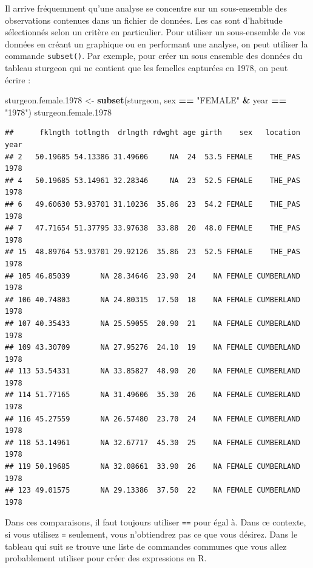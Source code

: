 \documentclass[12pt,]{book}
\makeatletter
\newenvironment{Shaded}{\begin{snugshade}}{\end{snugshade}}
\newcommand{\FloatTok}[1]{\textcolor[rgb]{0.06,0.06,0.06}{#1}}
\newcommand{\KeywordTok}[1]{\textcolor[rgb]{0.27,0.27,0.27}{\textbf{#1}}}
\newcommand{\NormalTok}[1]{#1}
\newcommand{\OperatorTok}[1]{\textcolor[rgb]{0.43,0.43,0.43}{\textbf{#1}}}
\newcommand{\StringTok}[1]{\textcolor[rgb]{0.5,0.5,0.5}{#1}}
\newenvironment{kframe}{%
\medskip{}
\setlength{\fboxsep}{.8em}
 \def\at@end@of@kframe{}%
 \ifinner\ifhmode%
  \def\at@end@of@kframe{\end{minipage}}%
  \begin{minipage}{\columnwidth}%
 \fi\fi%
 \def\FrameCommand##1{\hskip\@totalleftmargin \hskip-\fboxsep
 \colorbox{shadecolor}{##1}\hskip-\fboxsep
     \hskip-\linewidth \hskip-\@totalleftmargin \hskip\columnwidth}%
 \MakeFramed {\advance\hsize-\width
   \@totalleftmargin\z@ \linewidth\hsize
   \@setminipage}}%
 {\par\unskip\endMakeFramed%
 \at@end@of@kframe}
\newenvironment{rmdblock}[1]
  {
  \begin{itemize}
  \renewcommand{\labelitemi}{
    \raisebox{-.7\height}[0pt][0pt]{
      {\setkeys{Gin}{width=3em,keepaspectratio}\texttt{[image: images/\#1]}}
    }
  }
  \setlength{\fboxsep}{1em}
  \begin{kframe}
  \item
  }
  {
  \end{kframe}
  \end{itemize}
  }
\newenvironment{rmdcaution}
  {\begin{rmdblock}{caution}}
  {\end{rmdblock}}
\makeatother
\begin{document}
Il arrive fréquemment qu'une analyse se concentre sur un sous-ensemble des observations contenues dans un fichier de données.
Les cas sont d'habitude sélectionnés selon un critère en particulier.
Pour utiliser un sous-ensemble de vos données en créant un graphique ou en performant une analyse, on peut utiliser la commande \texttt{subset()}.
Par exemple, pour créer un sous ensemble des données du tableau sturgeon qui ne contient que les femelles capturées en 1978, on peut écrire :

\begin{Shaded}
\begin{Highlighting}[]
\NormalTok{sturgeon.female}\FloatTok{.1978}\NormalTok{ <-}\StringTok{ }\KeywordTok{subset}\NormalTok{(sturgeon, sex }\OperatorTok{==}\StringTok{ "FEMALE"} \OperatorTok{&}\StringTok{ }\NormalTok{year }\OperatorTok{==}\StringTok{ "1978"}\NormalTok{)}
\NormalTok{sturgeon.female}\FloatTok{.1978}
\end{Highlighting}
\end{Shaded}

\begin{verbatim}
##      fklngth totlngth  drlngth rdwght age girth    sex   location year
## 2   50.19685 54.13386 31.49606     NA  24  53.5 FEMALE    THE_PAS 1978
## 4   50.19685 53.14961 32.28346     NA  23  52.5 FEMALE    THE_PAS 1978
## 6   49.60630 53.93701 31.10236  35.86  23  54.2 FEMALE    THE_PAS 1978
## 7   47.71654 51.37795 33.97638  33.88  20  48.0 FEMALE    THE_PAS 1978
## 15  48.89764 53.93701 29.92126  35.86  23  52.5 FEMALE    THE_PAS 1978
## 105 46.85039       NA 28.34646  23.90  24    NA FEMALE CUMBERLAND 1978
## 106 40.74803       NA 24.80315  17.50  18    NA FEMALE CUMBERLAND 1978
## 107 40.35433       NA 25.59055  20.90  21    NA FEMALE CUMBERLAND 1978
## 109 43.30709       NA 27.95276  24.10  19    NA FEMALE CUMBERLAND 1978
## 113 53.54331       NA 33.85827  48.90  20    NA FEMALE CUMBERLAND 1978
## 114 51.77165       NA 31.49606  35.30  26    NA FEMALE CUMBERLAND 1978
## 116 45.27559       NA 26.57480  23.70  24    NA FEMALE CUMBERLAND 1978
## 118 53.14961       NA 32.67717  45.30  25    NA FEMALE CUMBERLAND 1978
## 119 50.19685       NA 32.08661  33.90  26    NA FEMALE CUMBERLAND 1978
## 123 49.01575       NA 29.13386  37.50  22    NA FEMALE CUMBERLAND 1978
\end{verbatim}

\begin{rmdcaution}
Dans ces comparaisons, il faut toujours utiliser \texttt{==} pour égal à.
Dans ce contexte, si vous utilisez \texttt{=} seulement, vous n'obtiendrez pas ce que vous désirez.
Dans le tableau qui suit se trouve une liste de commandes communes que vous allez probablement utiliser pour créer des expressions en R.
\end{rmdcaution}
\end{document}
